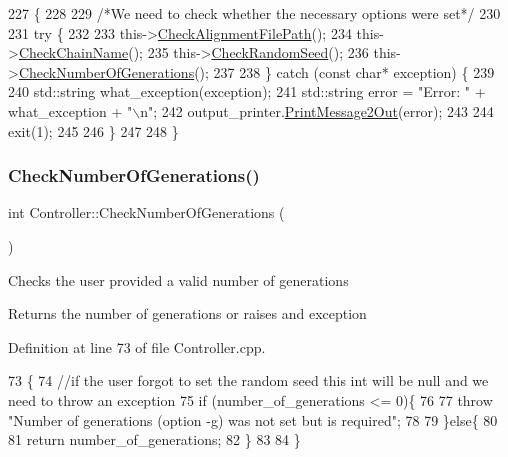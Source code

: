 \begin{DoxyCode}
227                                  \{
228   
229   \textcolor{comment}{/*We need to check whether the necessary options were set*/}
230   
231   \textcolor{keywordflow}{try} \{
232     
233     this->\hyperlink{classController_a79fd3abba4177d597d571a97032c6432}{CheckAlignmentFilePath}();
234     this->\hyperlink{classController_a207236dbade67acf265531bfa7769056}{CheckChainName}();
235     this->\hyperlink{classController_a0a7005db27b63a01f4917134da0ae600}{CheckRandomSeed}();
236     this->\hyperlink{classController_a6d3e56483122b9580adef5475527a0f7}{CheckNumberOfGenerations}();
237         
238   \} \textcolor{keywordflow}{catch} (\textcolor{keyword}{const} \textcolor{keywordtype}{char}* exception) \{
239     
240     std::string what\_exception(exception);
241     std::string error = \textcolor{stringliteral}{"Error: "} + what\_exception + \textcolor{stringliteral}{"\(\backslash\)n"};
242     output\_printer.\hyperlink{classOutputPrinter_ae9cd642df56fb6febef4cccff7ca12f2}{PrintMessage2Out}(error);
243     
244     exit(1);
245     
246   \}
247   
248 \}
\end{DoxyCode}
\mbox{\label{classController_a6d3e56483122b9580adef5475527a0f7}} 
\subsubsection{\texorpdfstring{Check\+Number\+Of\+Generations()}{CheckNumberOfGenerations()}}
{\footnotesize\ttfamily int Controller\+::\+Check\+Number\+Of\+Generations (\begin{DoxyParamCaption}{ }\end{DoxyParamCaption})}

Checks the user provided a valid number of generations \begin{DoxyReturn}{Returns}
the number of generations or raises and exception 
\end{DoxyReturn}


Definition at line 73 of file Controller.\+cpp.


\begin{DoxyCode}
73                                         \{
74   \textcolor{comment}{//if the user forgot to set the random seed this int will be null and we need to throw an exception}
75   \textcolor{keywordflow}{if} (number\_of\_generations <= 0)\{
76     
77     \textcolor{keywordflow}{throw} \textcolor{stringliteral}{"Number of generations (option -g) was not set but is required"};
78     
79   \}\textcolor{keywordflow}{else}\{
80   
81     \textcolor{keywordflow}{return} number\_of\_generations;
82   \}
83   
84 \}
\end{DoxyCode}
\mbox{\label{classController_a0a7005db27b63a01f4917134da0ae600}} 
